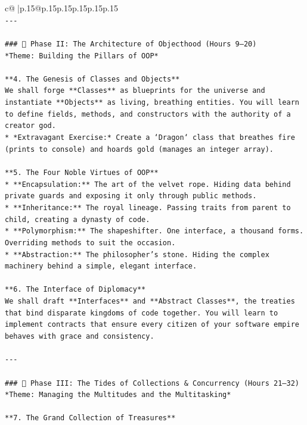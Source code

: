\documentclass{article}
\begin{document}
{\begin{supertabular}{c@{$\;$}|p{.15\linewidth}@{}p{.15\linewidth}p{.15\linewidth}p{.15\linewidth}p{.15\linewidth}p{.15\linewidth}}
{{{\\ 
\texttt{{-}{-}{-}} \\
\\ 
\texttt{\#\#\# 🏰 Phase II: The Architecture of Objecthood (Hours 9–20)} \\
\texttt{*Theme: Building the Pillars of OOP*} \\
\\ 
\texttt{**4. The Genesis of Classes and Objects**} \\
\texttt{We shall forge **Classes** as blueprints for the universe and instantiate **Objects** as living, breathing entities. You will learn to define fields, methods, and constructors with the authority of a creator god.} \\
\texttt{*   *Extravagant Exercise:* Create a `Dragon` class that breathes fire (prints to console) and hoards gold (manages an integer array).} \\
\\ 
\texttt{**5. The Four Noble Virtues of OOP**} \\
\texttt{*   **Encapsulation:** The art of the velvet rope. Hiding data behind private guards and exposing it only through public methods.} \\
\texttt{*   **Inheritance:** The royal lineage. Passing traits from parent to child, creating a dynasty of code.} \\
\texttt{*   **Polymorphism:** The shapeshifter. One interface, a thousand forms. Overriding methods to suit the occasion.} \\
\texttt{*   **Abstraction:** The philosopher's stone. Hiding the complex machinery behind a simple, elegant interface.} \\
\\ 
\texttt{**6. The Interface of Diplomacy**} \\
\texttt{We shall draft **Interfaces** and **Abstract Classes**, the treaties that bind disparate kingdoms of code together. You will learn to implement contracts that ensure every citizen of your software empire behaves with grace and consistency.} \\
\\ 
\texttt{{-}{-}{-}} \\
\\ 
\texttt{\#\#\# 🌊 Phase III: The Tides of Collections \& Concurrency (Hours 21–32)} \\
\texttt{*Theme: Managing the Multitudes and the Multitasking*} \\
\\ 
\texttt{**7. The Grand Collection of Treasures**} \\
}}}
\end{supertabular}}
\end{document}
